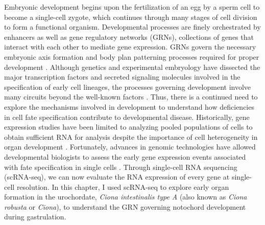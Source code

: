 Embryonic development begins upon the fertilization of an egg by a sperm cell to become a single-cell zygote, which continues through many stages of cell division to form a functional organism. Developmental processes are finely orchestrated by enhancers as well as gene regulatory networks (GRNs), collections of genes that interact with each other to mediate gene expression. GRNs govern the necessary embryonic axis formation and body plan patterning processes required for proper development \cite{levine2010,xie2013,kvon2021,romanoski2015,olson2006,davidson2008,levine2005,imai2006}. Although genetics and experimental embryology have dissected the major transcription factors and secreted signaling molecules involved in the specification of early cell lineages, the processes governing development involve many circuits beyond the well-known factors \cite{romanoski2015,olson2006,davidson2008,levine2005,imai2004,imai2006}. Thus, there is a continued need to explore the mechanisms involved in development to understand how deficiencies in cell fate specification contribute to developmental disease. Historically, gene expression studies have been limited to analyzing pooled populations of cells to obtain sufficient RNA for analysis despite the importance of cell heterogeneity in organ development \cite{romanoski2015,wang2020,hong2020,li2021}. Fortunately, advances in genomic technologies have allowed developmental biologists to assess the early gene expression events associated with fate specification in single cells \cite{olsen2018,macosko2015,tang2009,jovic2022,papalexi2018}. Through single-cell RNA sequencing (scRNA-seq), we can now evaluate the RNA expression of every gene at single-cell resolution. In this chapter, I used scRNA-seq to explore early organ formation in the urochordate, \textit{Ciona intestinalis type A} (also known as \textit{Ciona robusta} or \textit{Ciona}), to understand the GRN governing notochord development during gastrulation.

